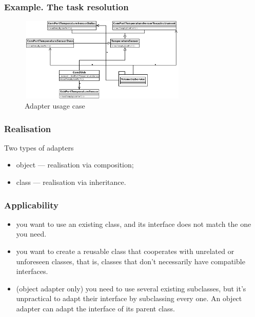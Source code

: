\documentclass[10pt,xcolor={usenames,dvipsnames}]{beamer}
\begin{document}
\begin{frame}[fragile]
	\frametitle{Example. The task resolution}
	\begin{figure}
		\includegraphics[height=4cm,width=8cm]{adapter-task-resolution1.png}
		\caption{Adapter usage case}
	\end{figure}
\end{frame}

\begin{frame}[fragile]
	\frametitle{Realisation}
	\begin{exampleblock}{Two types of adapters}
		\begin{itemize}
		\item object --- realisation  via composition;
		\item class --- realisation via inheritance.
		\end{itemize}
	\end{exampleblock}
\end{frame}

\begin{frame}[fragile]
	\frametitle{Applicability}
	\begin{exampleblock}{}
		\begin{itemize}
		\item you want to use an existing class, and its interface does not match the one you need.
		\item you want to create a reusable class that cooperates with unrelated or
		unforeseen classes, that is, classes that don't necessarily have compatible interfaces.
		\item (object adapter only) you need to use several existing subclasses, but it's
		unpractical to adapt their interface by subclassing every one. An object adapter
		can adapt the interface of its parent class.
	\end{itemize}
	\end{exampleblock}
\end{frame}
\end{document}
